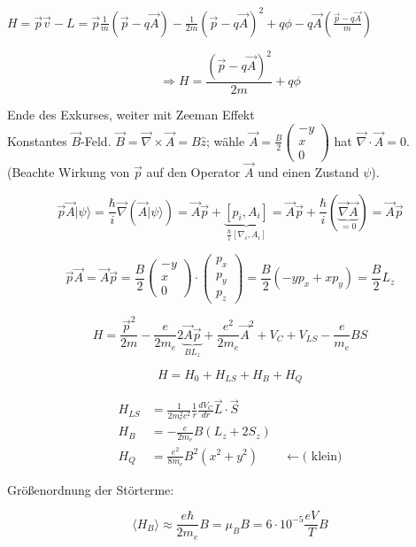 \(H = \vec p \vec v - L = \vec p \frac{1}{m}(\vec p - q \vec A) -\frac{1}{2m}(\vec p - q \vec A)^2+q\phi-q\vec A(\frac{\vec p - q \vec A}{m})\)

\[\Rightarrow H = \frac{(\vec p - q\vec A)^2}{2m}+q\phi\]

Ende des Exkurses, weiter mit Zeeman Effekt
\\

Konstantes \(\vec B\)-Feld. \(\vec B = \vec \nabla \times \vec A = B\hat z\); wähle \(\vec A = \frac{B}{2}\begin{pmatrix} -y \\ x \\ 0 \end{pmatrix}\) hat \(\vec \nabla\cdot \vec A=0\). (Beachte Wirkung von \(\vec p\) auf den Operator \(\vec A\) und einen Zustand \(\psi\)).

\[ \vec p \vec A|\psi\rangle  = \frac{\hbar}{i}\vec \nabla (\vec A|\psi\rangle ) = \vec A\vec p + \underbrace{[p_i,A_i]}_{\frac{\hbar}{i}[\nabla_i,A_i]}=\vec A\vec p + \frac{\hbar}{i}(\underbrace{\vec \nabla\vec A}_{=0})=\vec A\vec p\]

\[\vec p \vec A = \vec A\vec p = \frac{B}{2}\begin{pmatrix} -y \\ x \\ 0 \end{pmatrix}\cdot\begin{pmatrix} p_x \\ p_y \\ p_z \end{pmatrix} = \frac{B}{2}(-yp_x + xp_y)=\frac{B}{2}L_z\]

\[ H=\frac{\vec p^2}{2m}-\frac{e}{2m_e}2\underbrace{\vec A\vec p}_{BL_z}+\frac{e^2}{2m_e}\vec A^2 + V_C+V_{LS}-\frac{e}{m_e}BS\]

\[H=H_0+H_{LS}+H_B+H_Q\]

\begin{align}
H_{LS} &= \frac{1}{2m^2_ec^2}\frac{1}{r}\frac{dV_C}{dr}\vec L\cdot\vec S\\
H_B&=-\frac{e}{2m_e}B(L_z+2S_z)\\ 
H_Q &= \frac{e^2}{8m_e}B^2(x^2+y^2) \qquad \leftarrow \text{( klein)}
\end{align}



Größenordnung der Störterme:



\[\langle H_B\rangle \approx \frac{e\hbar}{2m_e}B=\mu_BB = 6\cdot 10^{-5}\frac{eV}{T}B\]


